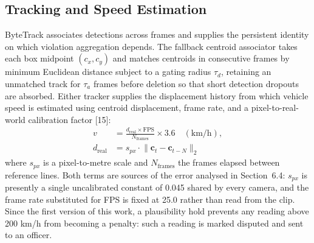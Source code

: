 \documentclass[10pt,a4paper,twocolumn]{article}
\begin{document}
\subsection{Tracking and Speed Estimation}
ByteTrack associates detections across frames and supplies the persistent identity on which violation aggregation
depends. The fallback centroid associator takes each box midpoint $(c_x,c_y)$ and matches centroids in consecutive
frames by minimum Euclidean distance subject to a gating radius $\tau_d$, retaining an unmatched track for $\tau_a$
frames before deletion so that short detection dropouts are absorbed. Either tracker supplies the displacement history
from which vehicle speed is estimated using centroid displacement, frame rate, and a pixel-to-real-world calibration
factor [15]:
\begin{equation}
\begin{aligned}
v &= \frac{d_{\mathrm{real}}\times \mathrm{FPS}}{N_{\mathrm{frames}}}\times 3.6 \quad (\mathrm{km/h}),\\
d_{\mathrm{real}} &= s_{px}\cdot \lVert \mathbf{c}_t-\mathbf{c}_{t-N}\rVert_2
\end{aligned}
\end{equation}
where $s_{px}$ is a pixel-to-metre scale and $N_{\mathrm{frames}}$ the frames elapsed between reference lines. Both
terms are sources of the error analysed in Section~6.4: $s_{px}$ is presently a single uncalibrated constant of 0.045
shared by every camera, and the frame rate substituted for FPS is fixed at 25.0 rather than read from the clip. Since
the first version of this work, a plausibility hold prevents any reading above 200 km/h from becoming a penalty: such
a reading is marked disputed and sent to an officer.
\end{document}
